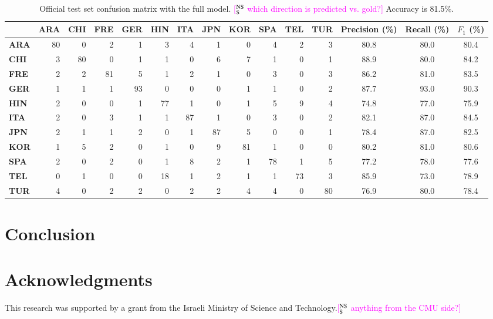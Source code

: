 \documentclass[11pt,letterpaper]{article}
\newcommand{\ensuretext}[1]{#1}
\newcommand{\nssmarker}{\ensuretext{\textcolor{magenta}{\ensuremath{^{\textsc{NS}}_{\textsc{S}}}}}}
\newcommand{\arkcomment}[3]{\ensuretext{\textcolor{#3}{[#1 #2]}}}
\newcommand{\nss}[1]{\arkcomment{\nssmarker}{#1}{magenta}}
\begin{document}
\begin{table*}\small\centering
\begin{tabular}{>{\bf}l|r@{ }r@{ }r@{ }r@{ }r@{ }r@{ }r@{ }r@{ }r@{ }r@{ }r|ccc} %
	& \bf ARA & \bf CHI & \bf FRE & \bf GER & \bf HIN & \bf ITA & \bf JPN & \bf KOR & \bf SPA & \bf TEL & \bf TUR & \bf Precision (\%) & \bf Recall (\%) & \bf $F_1$ (\%) \\
\hline
ARA & 80 & 0 & 2 & 1 & 3 & 4 & 1 & 0 & 4 & 2 & 3 & 80.8 & 80.0 & 80.4 \\
CHI & 3 & 80 & 0 & 1 & 1 & 0 & 6 & 7 & 1 & 0 & 1 & 88.9 & 80.0 & 84.2 \\
FRE & 2 & 2 & 81 & 5 & 1 & 2 & 1 & 0 & 3 & 0 & 3 & 86.2 & 81.0 & 83.5 \\
\hline
GER & 1 & 1 & 1 & 93 & 0 & 0 & 0 & 1 & 1 & 0 & 2 & 87.7 & 93.0 & 90.3 \\
HIN & 2 & 0 & 0 & 1 & 77 & 1 & 0 & 1 & 5 & 9 & 4 & 74.8 & 77.0 & 75.9 \\
ITA & 2 & 0 & 3 & 1 & 1 & 87 & 1 & 0 & 3 & 0 & 2 & 82.1 & 87.0 & 84.5 \\
\hline
JPN & 2 & 1 & 1 & 2 & 0 & 1 & 87 & 5 & 0 & 0 & 1 & 78.4 & 87.0 & 82.5 \\
KOR & 1 & 5 & 2 & 0 & 1 & 0 & 9 & 81 & 1 & 0 & 0 & 80.2 & 81.0 & 80.6 \\
SPA & 2 & 0 & 2 & 0 & 1 & 8 & 2 & 1 & 78 & 1 & 5 & 77.2 & 78.0 & 77.6 \\
\hline
TEL & 0 & 1 & 0 & 0 & 18 & 1 & 2 & 1 & 1 & 73 & 3 & 85.9 & 73.0 & 78.9 \\
TUR & 4 & 0 & 2 & 2 & 0 & 2 & 2 & 4 & 4 & 0 & 80 & 76.9 & 80.0 & 78.4 \\
\end{tabular}
\caption{Official test set confusion matrix with the full model. \nss{which direction is predicted vs. gold?}
Accuracy is 81.5\%.}\label{tbl:matrix}
\end{table*}


\section{Conclusion}
\label{sec:conclusion}

\section*{Acknowledgments}
This research was supported by a grant from the Israeli Ministry of
Science and Technology.\nss{anything from the CMU side?}

\clearpage



\end{document}
